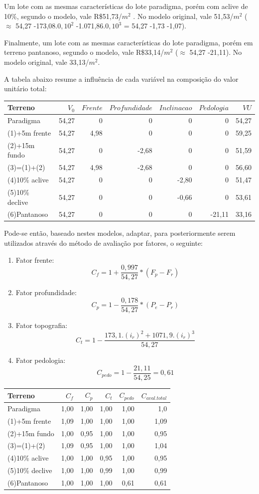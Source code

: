 \documentclass[a4paper, 12pt]{article}
\providecommand{\tightlist}{%
  \setlength{\itemsep}{0pt}\setlength{\parskip}{0pt}}
\begin{document}
Um lote com as mesmas características do lote paradigma, porém com
aclive de 10\%, segundo o modelo, vale R\$51,73/\(m^2\) . No modelo
original, vale 51,53/\(m^2\) (\(\approx\) 54,27 -173,08.\(0,10^2\)
-1.071,86.\(0,10^3\) = 54,27 -1,73 -1,07).

Finalmente, um lote com as mesmas características do lote paradigma,
porém em terreno pantanoso, segundo o modelo, vale R\$33,14/\(m^2\)
(\(\approx\) 54,27 -21,11). No modelo original, vale 33,13/\(m^2\).

A tabela abaixo resume a influência de cada variável na composição do
valor unitário total:

\begin{longtable}[]{@{}lrrrrrr@{}}
\toprule
Terreno & \(V_0\) & \(Frente\) & \(Profundidade\) & \(Inclinacao\) &
\(Pedologia\) & \(VU\)\tabularnewline
\midrule
\endhead
Paradigma & 54,27 & 0 & 0 & 0 & 0 & 54,27\tabularnewline
(1)+5m frente & 54,27 & 4,98 & 0 & 0 & 0 & 59,25\tabularnewline
(2)+15m fundo & 54,27 & 0 & -2,68 & 0 & 0 & 51,59\tabularnewline
(3)=(1)+(2) & 54,27 & 4,98 & -2,68 & 0 & 0 & 56,60\tabularnewline
(4)10\% aclive & 54,27 & 0 & 0 & -2,80 & 0 & 51,47\tabularnewline
(5)10\% declive & 54,27 & 0 & 0 & -0,66 & 0 & 53,61\tabularnewline
(6)Pantanoso & 54,27 & 0 & 0 & 0 & -21,11 & 33,16\tabularnewline
\bottomrule
\end{longtable}

Pode-se então, baseado nestes modelos, adaptar, para posteriormente
serem utilizados através do método de avaliação por fatores, o seguinte:

\begin{enumerate}
\def\labelenumi{\alph{enumi}.}
\tightlist
\item
  Fator frente: \[C_f = 1 + \frac{0,997}{54,27}*(F_p - F_r)\]
\item
  Fator profundidade: \[C_p = 1 - \frac{0,178}{54,27}*(P_e - P_r)\]
\item
  Fator topografia:
  \[C_t = 1 - \frac{173,1.(i_r)^2 + 1071,9.(i_r)^3}{54,27}\]
\item
  Fator pedologia: \[C_{pedo} = 1 - \frac{21,11}{54,25} = 0,61\]
\end{enumerate}

\begin{longtable}[]{@{}lrrrrr@{}}
\toprule
Terreno & \(C_f\) & \(C_p\) & \(C_t\) & \(C_{pedo}\) &
\(C_{aval. total}\)\tabularnewline
\midrule
\endhead
Paradigma & 1,00 & 1,00 & 1,00 & 1,00 & 1,0\tabularnewline
(1)+5m frente & 1,09 & 1,00 & 1,00 & 1,00 & 1,09\tabularnewline
(2)+15m fundo & 1,00 & 0,95 & 1,00 & 1,00 & 0,95\tabularnewline
(3)=(1)+(2) & 1,09 & 0,95 & 1,00 & 1,00 & 1,04\tabularnewline
(4)10\% aclive & 1,00 & 1,00 & 0,95 & 1,00 & 0,95\tabularnewline
(5)10\% declive & 1,00 & 1,00 & 0,99 & 1,00 & 0,99\tabularnewline
(6)Pantanoso & 1,00 & 1,00 & 1,00 & 0,61 & 0,61\tabularnewline
\bottomrule
\end{longtable}
\end{document}
